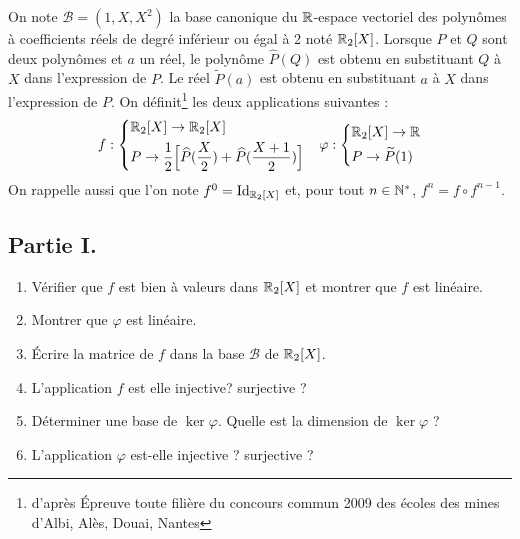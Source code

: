 On note $\mathcal B=(1,X,X^2)$ la base canonique du $\mathbb{R}$-espace vectoriel des polynômes à coefficients réels de degré inférieur ou égal à 2 noté $\mathbb{R}_2[X]$. Lorsque $P$ et $Q$ sont deux polynômes et $a$ un réel, le polynôme $\widehat{P}(Q)$ est obtenu en substituant $Q$ à $X$ dans l'expression de $P$. Le réel $\widetilde{P}(a)$ est obtenu en substituant $a$ à $X$ dans l'expression de $P$. \newline
On définit\footnote{d'après \'Epreuve toute filière du concours commun 2009 des écoles des mines d'Albi, Alès, Douai, Nantes} les deux applications suivantes :
\begin{align*}
 f:
\left\lbrace 
\begin{aligned}
 &\mathbb{R}_2[X] \rightarrow \mathbb{R}_2[X] \\
&P \rightarrow \frac{1}{2}
\Bigl[
\widehat{P}(\frac{X}{2}) + \widehat{P}(\frac{X+1}{2})
\Bigr]
\end{aligned}
\right. 
 & &
\varphi :
\left\lbrace
\begin{aligned}
& \mathbb{R}_2[X] \rightarrow \mathbb{R} \\
& P \rightarrow \widetilde{P}(1)
\end{aligned}
\right. 
\end{align*}
On rappelle aussi que l'on note $f^0=\operatorname{Id}_{\mathbb{R}_2[X]}$ et, pour tout $n\in \mathbb{N}^*$, $f^n=f\circ f^{n-1}$.
\subsection*{Partie I.}
\begin{enumerate}
 \item Vérifier que $f$ est bien à valeurs dans $\mathbb{R}_2[X]$ et montrer que $f$ est linéaire.
\item Montrer que $\varphi$ est linéaire.
\item \'Ecrire la matrice de $f$ dans la base $\mathcal B$ de $\mathbb{R}_2[X]$.
\item L'application $f$ est elle injective? surjective ?
\item Déterminer une base de $\ker \varphi$. Quelle est la dimension de $\ker \varphi$ ?
\item L'application $\varphi$ est-elle injective ? surjective ?
\end{enumerate}

